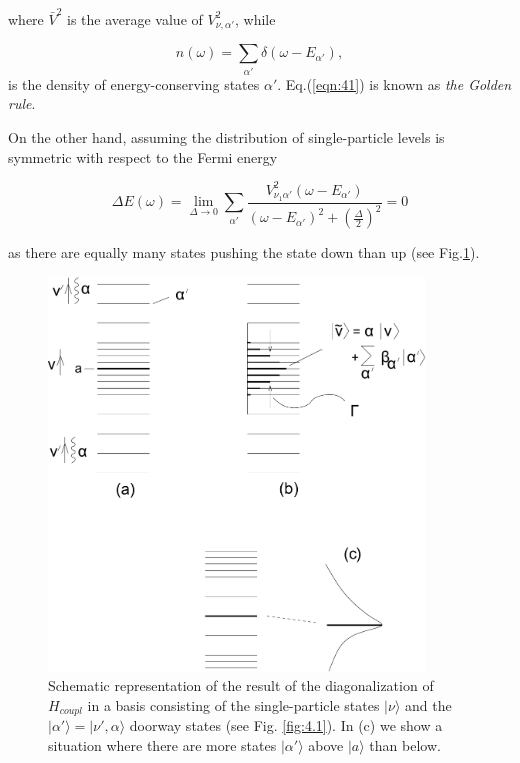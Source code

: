 \noindent where $\bar{V}^2$ is the average value of $V_{\nu ,\alpha'}^2$, while

\begin{equation}
n(\omega) = \sum_{\alpha'} \delta(\omega - E_{\alpha'}) ,
\label{eqn:42}
\end{equation}
is the density of energy-conserving states $\alpha'$. Eq.(\ref{eqn:41}) is known as {\it the Golden rule}.

On the other hand, assuming the distribution of single-particle levels is symmetric with respect to the Fermi energy

\begin{equation}
\Delta E(\omega) = \lim_{\Delta \rightarrow 0} \sum_{\alpha'} \frac{V_{\nu_1 \alpha'}^2 (\omega - E_{\alpha'})}{(\omega - E_{\alpha'})^2 + \left( \frac{\Delta}{2} \right)^2} = 0
\end{equation}

\noindent as there are equally many states pushing the state down than up (see Fig.\ref{fig:4.5}).

\begin{figure}
\centerline {
\includegraphics*[width=10cm]{introduccion/figs/figintroD5}
}
\caption{Schematic representation of the result of the diagonalization of $H_{coupl}$ in a basis consisting of the single-particle states $|\nu \rangle$ and the $|\alpha' \rangle=|\nu', {\alpha} \rangle$ doorway states (see Fig. \ref{fig:4.1}). In (c) we show a situation where there are more states $|\alpha' \rangle$ above $|a\rangle$ than below.}
\label{fig:4.5}
\end{figure}


